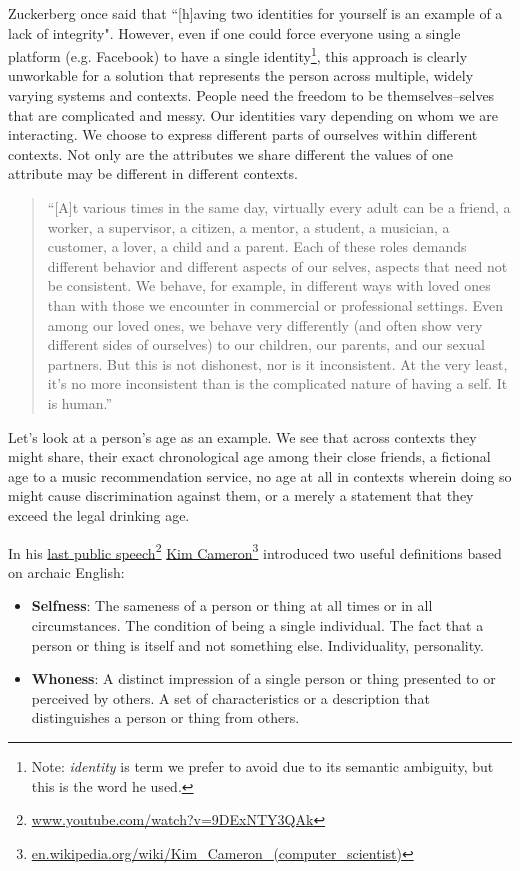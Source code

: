 \documentclass[11pt, oneside]{article}   	%
\newcommand{\hyperfootnote}[1][]{\def\ArgI{{#1}}\hyperfootnoteRelay}
\newcommand\hyperfootnoteRelay[2][]{\href{#1#2}{\ArgI}\footnote{\href{#1#2}{#2}}}
\begin{document}
Zuckerberg once said that ``[h]aving two identities for yourself is an example of a lack of integrity"\cite{Kirkpatrick2011}. However, even if one could force everyone using a single platform (e.g. Facebook) to have a single identity\footnote{Note: \emph{identity} is term we prefer to avoid due to its semantic ambiguity, but this is the word he used.}, this approach is clearly unworkable for a solution that represents the person across multiple, widely varying systems and contexts. People need the freedom to be themselves--selves that are complicated and messy. Our identities vary depending on whom we are interacting. We choose to express different parts of ourselves within different contexts. Not only are the attributes we share different the values of one attribute may be different in different contexts. 

\begin{quote} 
	``[A]t various times in the same day, virtually every adult can be a friend, a worker, a supervisor, a citizen, a mentor, a student, a musician, a customer, a lover, a child and a parent. Each of these roles demands different behavior and different aspects of our selves, aspects that need not be consistent. We behave, for example, in different ways with loved ones than with those we encounter in commercial or professional settings. Even among our loved ones, we behave very differently (and often show very different sides of ourselves) to our children, our parents, and our sexual partners. But this is not dishonest, nor is it inconsistent. At the very least, it's no more inconsistent than is the complicated nature of having a self. It is human.''\cite[p122]{Richards2021}
\end{quote}

Let's look at a person's age as an example. We see that across contexts they might share, their exact chronological age among their close friends, a fictional age to a music recommendation service, no age at all in contexts wherein doing so might cause discrimination against them, or a merely a statement that they exceed the legal drinking age. 

In his \hyperfootnote[last public speech][https://]{www.youtube.com/watch?v=9DExNTY3QAk}  
\hyperfootnote[Kim Cameron][https://]{en.wikipedia.org/wiki/Kim\_Cameron\_(computer\_scientist)} introduced two useful definitions based on archaic English:

\begin{itemize}
\item \textbf{Selfness}: The sameness of a person or thing at all times or in all circumstances. The condition of being a single individual. The fact that a person or thing is itself and not something else. Individuality, personality. 
\item \textbf{Whoness}: A distinct impression of a single person or thing presented to or perceived by others. A set of characteristics or a description that distinguishes a person or thing from others. 
\end{itemize}
\end{document}
